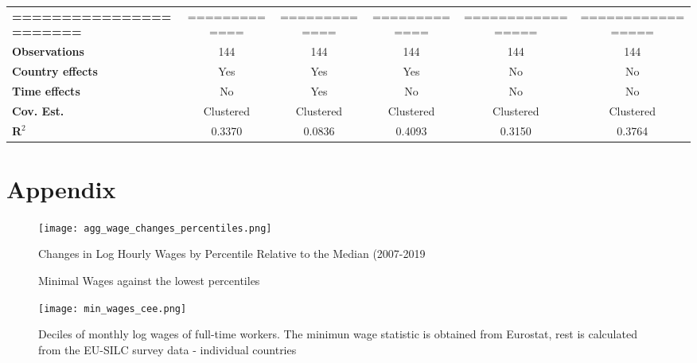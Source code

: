 \documentclass{article}
\begin{document}
\begin{table}[!htbp]
\begin{center}
{\begin{tabular}{lccccc}
\textbf{=======================} &        =============         &         =============          &  =============   & ================= & =================  \\
\textbf{Observations}        &             144              &              144               &       144        &        144        &        144         \\
\textbf{Country effects}                 &            Yes           &             Yes             &      Yes      &    No               &         No         \\
\textbf{Time effects}                 &            No           &             Yes             &      No      &    No               &         No         \\
\textbf{Cov. Est.}               &          Clustered           &           Clustered            &    Clustered     &     Clustered     &     Clustered      \\
\textbf{R$^{2}$}               &            0.3370            &             0.0836             &      0.4093      &       0.3150      &       0.3764       \\
\bottomrule
\end{tabular}
}
\end{center}
\end{table}












\newpage

\section{Appendix}

\begin{figure}[!htbp]%
    \centering
    {\texttt{[image: agg\_wage\_changes\_percentiles.png]} }
    \caption{Changes in Log Hourly Wages by Percentile Relative to the Median (2007-2019}
    \label{agg_wage_changes_percentiles}
\end{figure}



\begin{figure}[!htbp]%
    \centering
    \caption{Minimal Wages against the lowest percentiles}
    {\texttt{[image: min\_wages\_cee.png]} }
    \label{low_deciles_vs_min_w_cee}
    \caption*{Deciles of monthly log wages of full-time workers. The minimun wage statistic is obtained from Eurostat, rest is calculated from the EU-SILC survey data - individual countries}
\end{figure}
\end{document}
